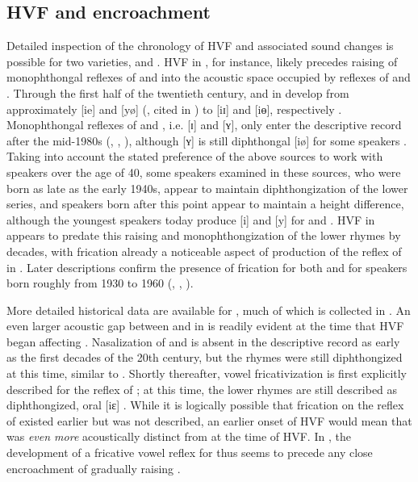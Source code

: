 \documentclass[output=paper,hidelinks]{langscibook}
\begin{document}
\subsection{HVF and encroachment}

Detailed inspection of the chronology of HVF and associated sound changes is possible for two \THW{} varieties, \SC{} and . HVF in \SC{}, for instance, likely precedes raising of monophthongal reflexes of \prien{} and \pryen{} into the acoustic space occupied by reflexes of \pri{} and \pry{}. Through the first half of the twentieth century, \prien{} and \pryen{} in \SC{} develop from approximately [ie] and [yø] (\citealt[]{Lu1935}, cited in \citealt[]{ting-suzhou}) to [iɪ] and [iɵ], respectively \citep{ye-suzhou, qian}. Monophthongal reflexes of \prien{} and \pryen{}, i.e. [ɪ] and [ʏ], only enter the descriptive record after the mid-1980s (\citealt[45]{wang-suzhou-re}, \citealt[54--55]{ling-diphthong}, \citealt{ling-phd}), although [ʏ] is still diphthongal [iø] for some speakers \citep[55--55]{ling-diphthong}. Taking into account the stated preference of the above sources to work with speakers over the age of 40, some speakers examined in these sources, who were born as late as the early 1940s, appear to maintain diphthongization of the lower series, and speakers born after this point appear to maintain a height difference, although the youngest speakers today produce [i] and [y] for \prien{} and \pryen{}. HVF in \SC{} appears to predate this raising and monophthongization of the lower rhymes by decades, with frication already a noticeable aspect of production of the reflex of \pri{} in \citet{Chao2017}. Later descriptions confirm the presence of frication for both \pri{} and \pry{} for speakers born roughly from 1930 to 1960 (\citealt[45]{wang-suzhou-re}, \citealt{qian}, \citealt[61--66]{ling-phd}).

More detailed historical data are available for , much of which is collected in \citet{qian-change}. An even larger acoustic gap between \pri{} and \prien{} in  is readily evident at the time that HVF began affecting \pri{}. Nasalization of \prien{} and \pryen{} is absent in the descriptive record as early as the first decades of the 20th century, but the rhymes were still diphthongized at this time, similar to \SC{} \citep[22--23]{qian-change}. Shortly thereafter, vowel fricativization is first explicitly described for the reflex of \pri{}; at this time, the lower rhymes are still described as diphthongized, oral [iɛ] \citep{Chao2017, qian-change}. While it is logically possible that frication on the reflex of \pri{} existed earlier but was not described, an earlier onset of HVF would mean that \prien{} was \textit{even more} acoustically distinct from \pri{} at the time of HVF. In , the development of a fricative vowel reflex for \pri{} thus seems to precede any close encroachment of gradually raising \prien{}.
\end{document}
